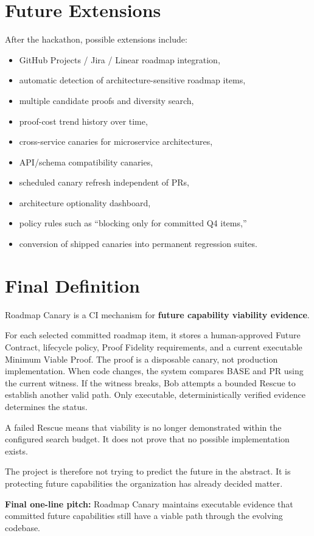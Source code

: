 \documentclass[12pt]{article}
\begin{document}
\section{Future Extensions}

After the hackathon, possible extensions include:

\begin{itemize}
    \item GitHub Projects / Jira / Linear roadmap integration,
    \item automatic detection of architecture-sensitive roadmap items,
    \item multiple candidate proofs and diversity search,
    \item proof-cost trend history over time,
    \item cross-service canaries for microservice architectures,
    \item API/schema compatibility canaries,
    \item scheduled canary refresh independent of PRs,
    \item architecture optionality dashboard,
    \item policy rules such as ``blocking only for committed Q4 items,''
    \item conversion of shipped canaries into permanent regression suites.
\end{itemize}

\section{Final Definition}

Roadmap Canary is a CI mechanism for \textbf{future capability viability evidence}.

For each selected committed roadmap item, it stores a human-approved Future Contract, lifecycle policy, Proof Fidelity requirements, and a current executable Minimum Viable Proof. The proof is a disposable canary, not production implementation. When code changes, the system compares BASE and PR using the current witness. If the witness breaks, Bob attempts a bounded Rescue to establish another valid path. Only executable, deterministically verified evidence determines the status.

A failed Rescue means that viability is no longer demonstrated within the configured search budget. It does not prove that no possible implementation exists.

The project is therefore not trying to predict the future in the abstract. It is protecting future capabilities the organization has already decided matter.

\begin{pitchbox}
\textbf{Final one-line pitch:}
Roadmap Canary maintains executable evidence that committed future capabilities still have a viable path through the evolving codebase.
\end{pitchbox}
\end{document}
